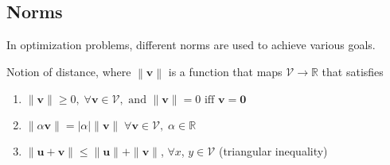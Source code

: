 \documentclass{article}
\begin{document}
    \subsection{Norms}
    In optimization problems, different norms are used to achieve various goals.
        \begin{definition}
            Notion of distance, where $\left\lVert \mathbf{v} \right\rVert$ is a function that maps $\mathcal{V} \rightarrow \mathbb{R}$ that satisfies 
            \begin{enumerate}
                \item \( \| \mathbf{v} \| \geq 0, \; \forall \mathbf{v} \in \mathcal{V}, \text{ and } \| \mathbf{v} \| = 0 \text{ iff } \mathbf{v} = \mathbf{0} \)
                \item \( \| \alpha \mathbf{v} \| = |\alpha| \| \mathbf{v} \| \; \forall \mathbf{v} \in \mathcal{V}, \; \alpha \in \mathbb{R} \)
                \item \( \| \mathbf{u} + \mathbf{v} \| \leq \| \mathbf{u} \| + \| \mathbf{v} \| \), $\forall x$, $y\in \mathcal{V}$ (triangular inequality)
            \end{enumerate}
        \end{definition}
\end{document}

